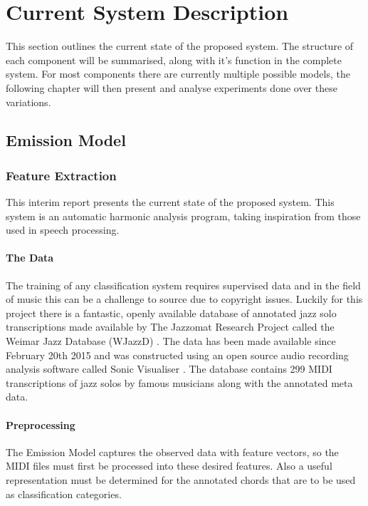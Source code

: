 \documentclass[bsc,singlespacing,parskip,deptreport,twoside,frontabs]{infthesis}
\begin{document}
\chapter{Current System Description}

This section outlines the current state of the proposed system. The structure of each component will be summarised, along with it's function in the complete system. For most components there are currently multiple possible models, the following chapter will then present and analyse experiments done over these variations.

\section{Emission Model}

\subsection{Feature Extraction}
This interim report presents the current state of the proposed system. This system is an automatic harmonic analysis program, taking inspiration from those used in speech processing.
\subsubsection{The Data}

The training of any classification system requires supervised data and in the field of music this can be a challenge to source due to copyright issues. Luckily for this project there is a fantastic, openly available database of annotated jazz solo transcriptions made available by The Jazzomat Research Project called the Weimar Jazz Database (WJazzD) \cite{wjazz}. The data has been made available since February 20th 2015 and was constructed using an open source audio recording analysis software called Sonic Visualiser \cite{sv}. The database contains 299 MIDI transcriptions of jazz solos by famous musicians along with the annotated meta data.

\subsubsection{Preprocessing}

The Emission Model captures the observed data with feature vectors, so the MIDI files must first be processed into these desired features. Also a useful representation must be determined for the annotated chords that are to be used as classification categories.
\end{document}
